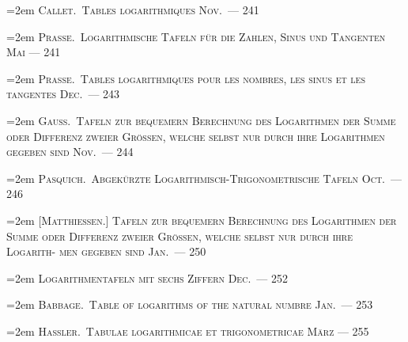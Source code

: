 \documentclass[12pt,a4paper]{article}
\begin{document}
\vspace{0.3em}
\noindent\hangindent=2em
\textsc{Callet.\ Tables logarithmiques  Nov.\ \dotfill --- 241}

\vspace{0.3em}
\noindent\hangindent=2em
\textsc{Prasse.\ Logarithmische Tafeln f\"ur die Zahlen, Sinus und Tangenten  Mai \dotfill --- 241}

\vspace{0.3em}
\noindent\hangindent=2em
\textsc{Prasse.\ Tables logarithmiques pour les nombres, les sinus et les tangentes  Dec.\ \dotfill --- 243}

\vspace{0.3em}
\noindent\hangindent=2em
\textsc{Gau\ss.\ Tafeln zur bequemern Berechnung des Logarithmen der Summe oder\linebreak
\hspace*{\fill} Differenz zweier Gr\"ossen, welche selbst nur durch ihre Logarithmen\linebreak
\hspace*{\fill} gegeben sind  Nov.\ \dotfill --- 244}

\vspace{0.3em}
\noindent\hangindent=2em
\textsc{Pasquich.\ Abgek\"urzte Logarithmisch-Trigonometrische Tafeln  Oct.\ \dotfill --- 246}

\vspace{0.3em}
\noindent\hangindent=2em
[\textsc{Matthiessen.}] \textsc{Tafeln zur bequemern Berechnung des Logarithmen der Summe\linebreak
\hspace*{\fill} oder Differenz zweier Gr\"ossen, welche selbst nur durch ihre Logarith-\linebreak
\hspace*{\fill} men gegeben sind  Jan.\ \dotfill --- 250}

\vspace{0.3em}
\noindent\hangindent=2em
\textsc{Logarithmentafeln mit sechs Ziffern  Dec.\ \dotfill --- 252}

\vspace{0.3em}
\noindent\hangindent=2em
\textsc{Babbage.\ Table of logarithms of the natural numbre  Jan.\ \dotfill --- 253}

\vspace{0.3em}
\noindent\hangindent=2em
\textsc{Hassler.\ Tabulae logarithmicae et trigonometricae  M\"arz \dotfill --- 255}
\end{document}
